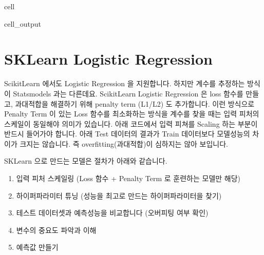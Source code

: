 \documentclass[letterpaper,10pt,english]{jupyterBook}
\begin{document}
\begin{sphinxuseclass}{cell}
\begin{sphinxVerbatimOutput}
\begin{sphinxuseclass}{cell_output}
\noindent{}

\end{sphinxuseclass}\end{sphinxVerbatimOutput}

\end{sphinxuseclass}

\part{SK\sphinxhyphen{}Learn \sphinxhyphen{} Logistic Regression}
\label{\detokenize{chapter5/5.2.2_Modeling_Library:sk-learn-logistic-regression}}
\sphinxAtStartPar
Scikit\sphinxhyphen{}Learn 에서도 Logistic Regression 을 지원합니다. 하지만 계수를 추정하는 방식이 Statsmodels 과는 다른데요. Scikit\sphinxhyphen{}Learn Logistic Regression 은 loss 함수를 만들고, 과대적합을 해결하기 위해 penalty term (L1/L2) 도 추가합니다. 이런 방식으로 Penalty Term 이 있는 Loss 함수를 최소화하는 방식을 계수를 찾을 때는 입력 피처의 스케일이 동일해야 의미가 있습니다. 아래 코드에서 입력 피쳐를 Scaling 하는 부분이 반드시 들어가야 합니다. 아래 Test 데이터의 결과가 Train 데이터보다 모델성능의 차이가 크지는 않습니다. 즉 overfitting(과대적합)이 심하지는 않아 보입니다.

\sphinxAtStartPar
SK\sphinxhyphen{}Learn 으로 만드는 모델은 절차가 아래와 같습니다.
\begin{enumerate}
%
\item {} 
\sphinxAtStartPar
입력 피처 스케일링 (Loss 함수 + Penalty Term 로 훈련하는 모델만 해당)

\item {} 
\sphinxAtStartPar
하이퍼파라미터 튜닝 (성능을 최고로 만드는 하이퍼파라미터을 찾기)

\item {} 
\sphinxAtStartPar
테스트 데이터셋과 예측성능을 비교합니다 (오버피팅 여부 확인)

\item {} 
\sphinxAtStartPar
변수의 중요도 파악과 이해

\item {} 
\sphinxAtStartPar
예측값 만들기

\end{enumerate}
\end{document}
